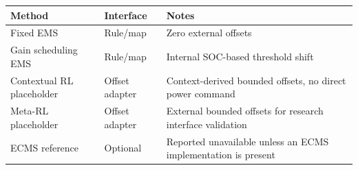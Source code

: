 \begin{tabular}{lll}
\toprule
Method & Interface & Notes \\
\midrule
Fixed EMS & Rule/map & Zero external offsets \\
Gain scheduling EMS & Rule/map & Internal SOC-based threshold shift \\
Contextual RL placeholder & Offset adapter & Context-derived bounded offsets, no direct power command \\
Meta-RL placeholder & Offset adapter & External bounded offsets for research interface validation \\
ECMS reference & Optional & Reported unavailable unless an ECMS implementation is present \\
\bottomrule
\end{tabular}
